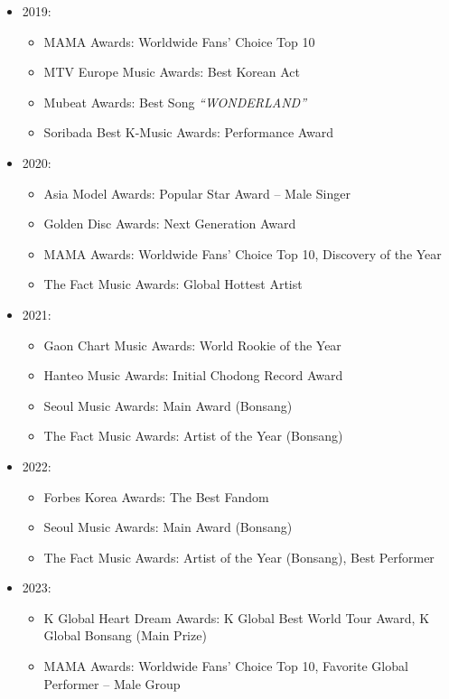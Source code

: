 \documentclass[a4paper,12pt]{article}
\begin{document}
\begin{itemize}
    \item 2019:
    \begin{itemize}
        \item MAMA Awards: Worldwide Fans’ Choice Top 10
        \item MTV Europe Music Awards: Best Korean Act
        \item Mubeat Awards: Best Song \textit{“WONDERLAND”}
        \item Soribada Best K-Music Awards: Performance Award
    \end{itemize}
    \item 2020:
    \begin{itemize}
        \item Asia Model Awards: Popular Star Award – Male Singer
        \item Golden Disc Awards: Next Generation Award
        \item MAMA Awards: Worldwide Fans’ Choice Top 10, Discovery of the Year
        \item The Fact Music Awards: Global Hottest Artist
    \end{itemize}
    \item 2021:
    \begin{itemize}
        \item Gaon Chart Music Awards: World Rookie of the Year
        \item Hanteo Music Awards: Initial Chodong Record Award
        \item Seoul Music Awards: Main Award (Bonsang)
        \item The Fact Music Awards: Artist of the Year (Bonsang)
    \end{itemize}
    \item 2022:
    \begin{itemize}
        \item Forbes Korea Awards: The Best Fandom
        \item Seoul Music Awards: Main Award (Bonsang)
        \item The Fact Music Awards: Artist of the Year (Bonsang), Best Performer
    \end{itemize}
    \item 2023:
    \begin{itemize}
        \item K Global Heart Dream Awards: K Global Best World Tour Award, K Global Bonsang (Main Prize)
        \item MAMA Awards: Worldwide Fans’ Choice Top 10, Favorite Global Performer – Male Group

\end{itemize}
\end{itemize}
\end{document}
